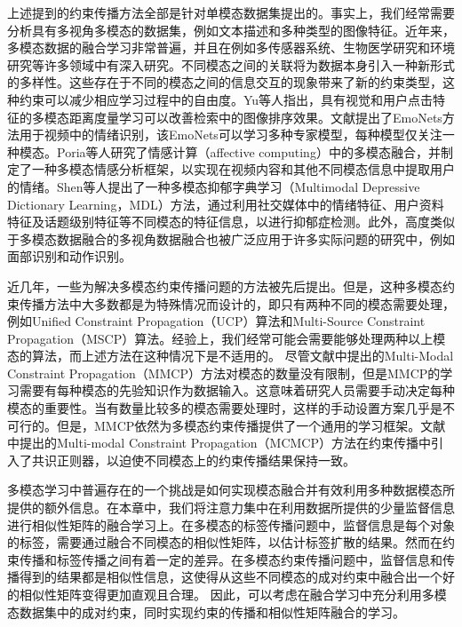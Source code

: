 上述提到的约束传播方法全部是针对单模态数据集提出的。事实上，我们经常需要分析具有多视角多模态的数据集，例如文本描述和多种类型的图像特征。近年来，多模态数据的融合学习非常普遍，并且在例如多传感器系统、生物医学研究和环境研究等许多领域中有深入研究。不同模态之间的关联将为数据本身引入一种新形式的多样性。这些存在于不同的模态之间的信息交互的现象带来了新的约束类型，这种约束可以减少相应学习过程中的自由度\cite{lahat2015multimodal}。Yu等人指出，具有视觉和用户点击特征的多模态距离度量学习可以改善检索中的图像排序效果\cite{yu2017deep}。文献\parencite{kahou2016emonets}提出了EmoNets方法用于视频中的情绪识别，该EmoNets可以学习多种专家模型，每种模型仅关注一种模态。Poria等人研究了情感计算（affective computing）中的多模态融合，并制定了一种多模态情感分析框架，以实现在视频内容和其他不同模态信息中提取用户的情绪\cite{poria2017review,poria2017ensemble}。Shen等人提出了一种多模态抑郁字典学习（Multimodal Depressive Dictionary Learning，MDL）\cite{shen2017depression}方法，通过利用社交媒体中的情绪特征、用户资料特征及话题级别特征等不同模态的特征信息，以进行抑郁症检测。此外，高度类似于多模态数据融合的多视角数据融合也被广泛应用于许多实际问题的研究中，例如面部识别\cite{kan2016multi}和动作识别\cite{shao2016kernelized}。

近几年，一些为解决多模态约束传播问题的方法被先后提出\cite{fu2011multi,fu2012modalities,lu2013unified,lu2013exhaustive}。但是，这种多模态约束传播方法中大多数都是为特殊情况而设计的，即只有两种不同的模态需要处理，例如Unified Constraint Propagation（UCP）\cite{lu2013unified}算法和Multi-Source Constraint Propagation（MSCP）\cite{lu2013exhaustive}算法。经验上，我们经常可能会需要能够处理两种以上模态的算法，而上述方法在这种情况下是不适用的。
尽管文献\parencite{fu2011multi}中提出的Multi-Modal Constraint Propagation（MMCP）方法对模态的数量没有限制，但是MMCP的学习需要有每种模态的先验知识作为数据输入。这意味着研究人员需要手动决定每种模态的重要性。当有数量比较多的模态需要处理时，这样的手动设置方案几乎是不可行的。但是，MMCP依然为多模态约束传播提供了一个通用的学习框架。文献\parencite{fu2012modalities}中提出的Multi-modal Constraint Propagation（MCMCP）方法在约束传播中引入了共识正则器，以迫使不同模态上的约束传播结果保持一致。

多模态学习中普遍存在的一个挑战是如何实现模态融合并有效利用多种数据模态所提供的额外信息。在本章中，我们将注意力集中在利用数据所提供的少量监督信息进行相似性矩阵的融合学习上。在多模态的标签传播问题中，监督信息是每个对象的标签，需要通过融合不同模态的相似性矩阵，以估计标签扩散的结果。然而在约束传播和标签传播之间有着一定的差异。在多模态约束传播问题中，监督信息和传播得到的结果都是相似性信息，这使得从这些不同模态的成对约束中融合出一个好的相似性矩阵变得更加直观且合理。 因此，可以考虑在融合学习中充分利用多模态数据集中的成对约束，同时实现约束的传播和相似性矩阵融合的学习。

